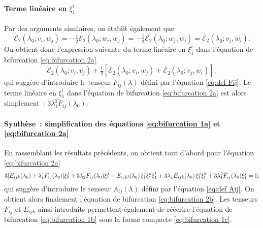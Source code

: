 \documentclass{article}
\newcommand{\nocomma}{}
\begin{document}
\paragraph{Terme linéaire en $\xi_1^i$}Par des arguments similaires, on
établit également que
\[ \dot{\mathcal{E}_2} (\lambda_0 ; v_i, w_j) = - \tfrac{1}{2} \mathcal{E}_2
   (\lambda_0 ; w_i, w_j) = - \tfrac{1}{2} \mathcal{E}_2 (\lambda_0 ; w_j,
   w_i) = \dot{\mathcal{E}_2} (\lambda_0 ; v_j, w_i) . \]
On obtient donc l'expression suivante du terme linéaire en $\xi_1^i$ dans
l'équation de bifurcation \eqref{eq:bifurcation 2a}
\[ \ddot{\mathcal{E}}_2 (\lambda_0 ; v_i, v_j) + \tfrac{1}{2}
   [\dot{\mathcal{E}_2} (\lambda_0 ; v_i, w_j) + \dot{\mathcal{E}_2}
   (\lambda_0 ; v_j, w_i)], \]
qui suggère d'introduire le tenseur $F_{i \nocomma j} (\lambda)$
défini par l'équation \eqref{eq:def Fij}. Le terme linéaire en
$\xi_1^i$ dans l'équation de bifurcation \eqref{eq:bifurcation 2a} est
alors simplement~: $3 \lambda_1^2  \dot{F}_{i \nocomma j} (\lambda_0)$.

\paragraph{Synthèse~: simplification des équations
\eqref{eq:bifurcation 1a} et \eqref{eq:bifurcation 2a}}En rassemblant les
résultats précédents, on obtient tout d'abord pour l'équation
\eqref{eq:bifurcation 2a}
\[ 3 [E_{i \nocomma j \nocomma k} (\lambda_0) + \lambda_1 F_{i \nocomma j}
   (\lambda_0)] \xi_2^j + 3 \lambda_2 F_{i \nocomma j} (\lambda_0) \xi_1^j +
   E_{i \nocomma j \nocomma k \nocomma l} (\lambda_0)  \hspace{0.17em} \xi_1^j
   \xi_1^k \xi_1^l + 3 \lambda_1  \dot{E}_{i \nocomma j \nocomma k}
   (\lambda_0)  \hspace{0.17em} \xi_1^j \xi_1^k + 3 \lambda_1^2  \dot{F}_{i
   \nocomma j} (\lambda_0) \xi_1^j = 0, \]
qui suggère d'introduire le tenseur $A_{i \nocomma j} (\lambda)$
défini par l'équation \eqref{eq:def Aij}. On obtient alors finalement
l'équation de bifurcation \eqref{eq:bifurcation 2b}. Les tenseurs $F_{i
\nocomma j}$ et $E_{i \nocomma j \nocomma k}$ ainsi introduits permettent
également de réécrire l'équation de bifurcation
\eqref{eq:bifurcation 1b} sous la forme compacte \eqref{eq:bifurcation 1c}.
\end{document}
